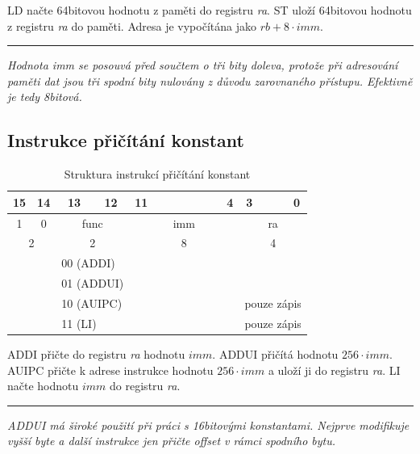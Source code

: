 \documentclass[
  digital, %
  color,   %
  table,   %
  twoside, %
  nolof,   %
  nolot,   %
]{fithesis3}
\begin{document}
LD načte 64bitovou hodnotu z paměti do registru \textit{ra}. ST uloží 64bitovou hodnotu z registru \textit{ra} do paměti. Adresa je vypočítána jako $rb + 8 \cdot imm$.

\noindent\rule{\textwidth}{1pt}
{\itshape
Hodnota {\normalfont imm} se posouvá před součtem o tři bity doleva, protože při adresování paměti dat jsou tři spodní bity nulovány z důvodu zarovnaného přístupu. Efektivně je tedy 8bitová.
}

\subsection{Instrukce přičítání konstant}
\begin{table}[H]
\caption{Struktura instrukcí přičítání konstant}
\begin{tabular}{cclccccccccccccc}
15 & 14 & \multicolumn{1}{c}{13} & 12 & 11 &  &  &  &  &  &  & 4 & 3 &  &  & 0 \\ \hline
\multicolumn{1}{|c}{1} & \multicolumn{1}{c|}{0} & \multicolumn{2}{c|}{func} & \multicolumn{8}{c|}{imm} & \multicolumn{4}{c|}{ra} \\ \hline
\multicolumn{2}{c}{{\color[HTML]{656565} 2}} & \multicolumn{2}{c}{{\color[HTML]{656565} 2}} & \multicolumn{8}{c}{{\color[HTML]{656565} 8}} & \multicolumn{4}{c}{{\color[HTML]{656565} 4}} \\
 &  & \multicolumn{2}{l}{00 (ADDI)} &  &  &  &  &  &  &  &  &  &  &  &  \\
 &  & \multicolumn{2}{l}{01 (ADDUI)} &  &  &  &  &  &  &  &  &  &  &  &  \\
\multicolumn{1}{l}{} & \multicolumn{1}{l}{} & \multicolumn{2}{l}{10 (AUIPC)} &  &  &  &  &  &  &  &  & \multicolumn{4}{c}{pouze zápis} \\
\multicolumn{1}{l}{} & \multicolumn{1}{l}{} & \multicolumn{2}{l}{11 (LI)} &  &  &  &  &  &  &  &  & \multicolumn{4}{c}{pouze zápis}
\end{tabular}
\end{table}

ADDI přičte do registru \textit{ra} hodnotu $imm$. ADDUI přičítá hodnotu $256 \cdot imm$. AUIPC přičte k adrese instrukce hodnotu $256 \cdot imm$ a uloží ji do registru \textit{ra}. LI načte hodnotu $imm$ do registru \textit{ra}.

\noindent\rule{\textwidth}{1pt}
{\itshape
ADDUI má široké použití při práci s 16bitovými konstantami. Nejprve modifikuje vyšší byte a další instrukce jen přičte offset v rámci spodního bytu.
}
\end{document}
